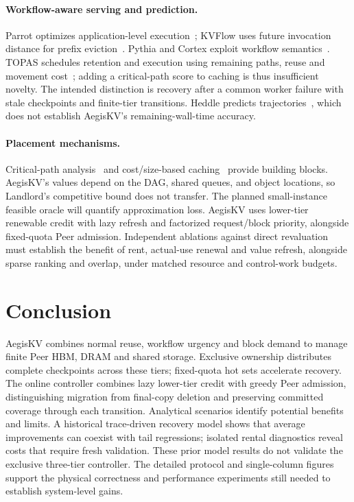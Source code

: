 \documentclass[sigplan,10pt,anonymous,nonacm]{acmart}
\begin{document}
\paragraph{Workflow-aware serving and prediction.}
Parrot optimizes application-level execution~\cite{lin2024parrot}; KVFlow
uses future invocation distance for prefix eviction~\cite{pan2025kvflow}.
Pythia and Cortex exploit workflow semantics~\cite{yu2026pythia,pagonas2025cortex}.
TOPAS schedules retention and execution using remaining paths, reuse and
movement cost~\cite{ni2026topas}; adding a critical-path score to caching
is thus insufficient novelty. The intended distinction is recovery after
a common worker failure with stale checkpoints and finite-tier transitions.
Heddle predicts trajectories~\cite{zhang2026heddle}, which does not establish
AegisKV's remaining-wall-time accuracy.

\paragraph{Placement mechanisms.}
Critical-path analysis~\cite{kelley1959cpm} and cost/size-based caching~\cite{young2002landlord}
provide building blocks. AegisKV's values depend on the DAG, shared queues,
and object locations, so Landlord's competitive bound does not transfer. The
planned small-instance feasible oracle will quantify approximation loss. AegisKV
uses lower-tier renewable credit with lazy refresh and factorized request/block
priority, alongside fixed-quota Peer admission. Independent ablations against
direct revaluation must establish the benefit of rent, actual-use renewal
and value refresh, alongside sparse ranking and overlap, under matched
resource and control-work budgets.

\section{Conclusion}
\label{sec:conclusion}

AegisKV combines normal reuse, workflow urgency and block demand to manage
finite Peer HBM, DRAM and shared storage. Exclusive ownership distributes
complete checkpoints across these tiers; fixed-quota hot sets accelerate
recovery. The online controller combines lazy lower-tier credit with greedy
Peer admission, distinguishing migration from final-copy deletion and
preserving committed coverage through each transition. Analytical
scenarios identify potential benefits and limits. A historical trace-driven
recovery model shows that average improvements can coexist with tail
regressions; isolated rental diagnostics reveal costs that require fresh
validation. These
prior model results do not validate the exclusive three-tier controller. The detailed
protocol and single-column figures support the physical correctness and performance
experiments still needed to establish system-level gains.
\end{document}
